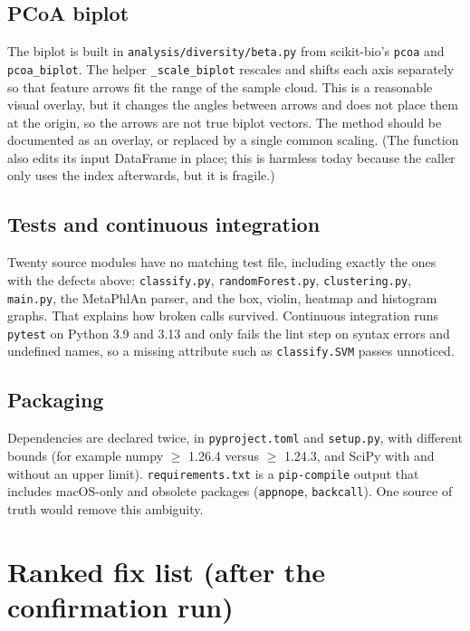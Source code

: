 \documentclass[11pt,a4paper]{article}
\newcommand{\code}[1]{\texttt{\small #1}}
\begin{document}
\subsection{PCoA biplot}

The biplot is built in \code{analysis/diversity/beta.py} from scikit-bio's \code{pcoa} and \code{pcoa\_biplot}. The helper
\code{\_scale\_biplot} rescales and shifts each axis separately so that feature arrows fit the range of the sample cloud.
This is a reasonable visual overlay, but it changes the angles between arrows and does not place them at the origin, so the
arrows are not true biplot vectors. The method should be documented as an overlay, or replaced by a single common scaling.
(The function also edits its input DataFrame in place; this is harmless today because the caller only uses the index afterwards,
but it is fragile.)

\subsection{Tests and continuous integration}

Twenty source modules have no matching test file, including exactly the ones with the defects above:
\code{classify.py}, \code{randomForest.py}, \code{clustering.py}, \code{main.py}, the MetaPhlAn parser, and the box, violin,
heatmap and histogram graphs. That explains how broken calls survived. Continuous integration runs \code{pytest} on Python 3.9
and 3.13 and only fails the lint step on syntax errors and undefined names, so a missing attribute such as \code{classify.SVM}
passes unnoticed.

\subsection{Packaging}

Dependencies are declared twice, in \code{pyproject.toml} and \code{setup.py}, with different bounds (for example numpy
$\geq$ 1.26.4 versus $\geq$ 1.24.3, and SciPy with and without an upper limit). \code{requirements.txt} is a
\code{pip-compile} output that includes macOS-only and obsolete packages (\code{appnope}, \code{backcall}). One source of
truth would remove this ambiguity.

\section{Ranked fix list (after the confirmation run)}
\end{document}

